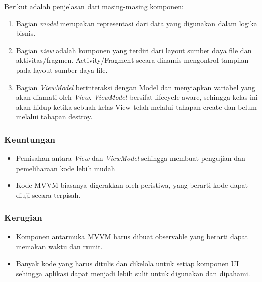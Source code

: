 \documentclass[conference]{IEEEtran}
\begin{document}
	Berikut adalah penjelasan dari masing-masing komponen:
	\begin{enumerate}[label=\alph*]
		\item Bagian \textit{model} merupakan representasi dari data yang digunakan dalam logika bisnis.
		\item Bagian \textit{view} adalah komponen yang terdiri dari layout sumber daya file dan aktivitas/fragmen. Activity/Fragment secara dinamis mengontrol tampilan pada layout sumber daya file.
		\item Bagian \textit{ViewModel} berinteraksi dengan Model dan menyiapkan variabel yang akan diamati oleh \textit{View}. \textit{ViewModel} bersifat lifecycle-aware, sehingga kelas ini akan hidup ketika sebuah kelas View telah melalui tahapan create dan belum melalui tahapan destroy.
	\end{enumerate}
	\subsubsection{Keuntungan}
	\begin{itemize}
		\item Pemisahan antara \textit{View} dan \textit{ViewModel} sehingga membuat pengujian dan pemeliharaan kode lebih mudah
		\item Kode MVVM biasanya digerakkan oleh peristiwa, yang berarti kode dapat diuji secara terpisah.
	\end{itemize}
	\subsubsection{Kerugian}
	\begin{itemize}
		\item Komponen antarmuka MVVM harus dibuat observable yang berarti dapat memakan waktu dan rumit.
		\item Banyak kode yang harus ditulis dan dikelola untuk setiap komponen UI sehingga aplikasi dapat menjadi lebih sulit untuk digunakan dan dipahami.
	\end{itemize}
	
\end{document}
